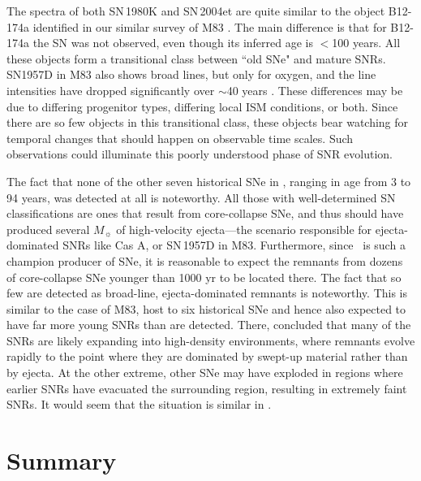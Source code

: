 The spectra of both SN\,1980K and SN\,2004et are quite  similar to the object B12-174a identified in our similar survey of M83 \citep{blair15}. The main difference is that for B12-174a the SN was not observed, even though its inferred age is $<$100 years.  All these objects form a transitional class between ``old SNe" and mature SNRs.  SN1957D in M83 also shows broad lines, but only for oxygen, and the line intensities have dropped significantly over $\sim$40 years \citep[][and references therein]{long12}.  These differences may be due to differing progenitor types, differing local ISM conditions, or both.  \citep[The \oiii\ lines would appear relatively stronger in both  SN\,1980K and SN\,2004et if these were dereddened, with $E(B-V) = 0.41$,][but even so they would not be nearly so O-dominated as SN\,1957D.]{fesen99b, sahu06} Since there are so few objects in this transitional class, these objects bear watching for temporal changes that should happen on observable time scales.  Such observations could illuminate this poorly understood phase of SNR evolution.

The fact that none of the other seven historical SNe in \gal, ranging in age from 3 to 94 years, was detected at all is noteworthy.  All those with well-determined SN classifications are ones that result from core-collapse SNe, and thus should have produced several $M_{\sun}$ of high-velocity ejecta---the scenario responsible for ejecta-dominated SNRs like Cas A, or SN\,1957D in M83.  Furthermore, since \gal\ is such a champion producer of SNe, it is reasonable to expect the remnants from dozens of core-collapse SNe younger than 1000 yr to be located there.  The fact that so few are detected as broad-line, ejecta-dominated remnants is noteworthy.   This is similar to the case of M83, host to six historical SNe and hence also expected to have far more young SNRs than are detected.  There, \citet{winkler17} concluded that many of the SNRs are likely expanding into high-density environments, where remnants evolve rapidly to the point where they are dominated by swept-up material rather than by ejecta. At the other extreme, other SNe may have exploded in regions where earlier SNRs have evacuated the surrounding region, resulting in extremely faint SNRs.  It would seem that the situation is similar in \gal.



\section{Summary \label{sec:summary}}

